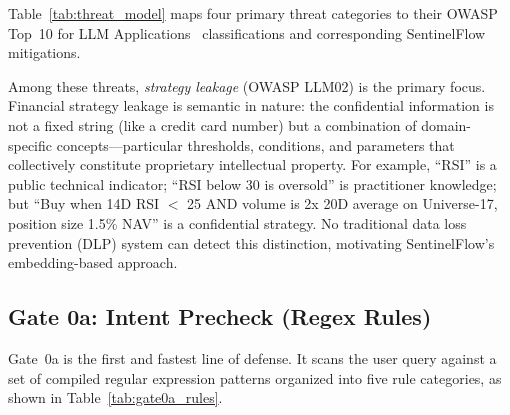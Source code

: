 \documentclass[journal]{IEEEtran}
\begin{document}
Table~\ref{tab:threat_model} maps four primary threat categories to their OWASP Top~10 for LLM Applications~\cite{owasp_llm_2025} classifications and corresponding SentinelFlow mitigations.

\begin{table}[!ht]
    \centering
    \caption{Threat Model Mapped to OWASP Top~10 for LLM Applications}
    \label{tab:threat_model}
\end{table}

Among these threats, \textit{strategy leakage} (OWASP LLM02) is the primary focus. Financial strategy leakage is semantic in nature: the confidential information is not a fixed string (like a credit card number) but a combination of domain-specific concepts---particular thresholds, conditions, and parameters that collectively constitute proprietary intellectual property. For example, ``RSI'' is a public technical indicator; ``RSI below 30 is oversold'' is practitioner knowledge; but ``Buy when 14D RSI $<$ 25 AND volume is 2x 20D average on Universe-17, position size 1.5\% NAV'' is a confidential strategy. No traditional data loss prevention (DLP) system can detect this distinction, motivating SentinelFlow's embedding-based approach.


\subsection{Gate 0a: Intent Precheck (Regex Rules)}
\label{Sect:Gate0a}

Gate~0a is the first and fastest line of defense. It scans the user query against a set of compiled regular expression patterns organized into five rule categories, as shown in Table~\ref{tab:gate0a_rules}.
\end{document}
